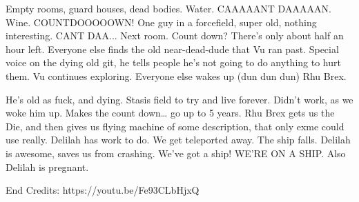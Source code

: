 Empty rooms, guard houses, dead bodies. Water. CAAAAANT DAAAAAN. Wine. COUNTDOOOOOWN! One guy in a forcefield, super old, nothing interesting. CANT DAA... Next room. Count down? There’s only about half an hour left. Everyone else finds the old near-dead-dude that Vu ran past. Special voice on the dying old git, he tells people he’s not going to do anything to hurt them. Vu continues exploring. Everyone else wakes up (dun dun dun) Rhu Brex.\medskip

He’s old as fuck, and dying. Stasis field to try and live forever. Didn’t work, as we woke him up. Makes the count down… go up to 5 years. Rhu Brex gets us the Die, and then gives us flying machine of some description, that only exme could use really. Delilah has work to do. We get teleported away. The ship falls. Delilah is awesome, saves us from crashing. We’ve got a ship! WE’RE ON A SHIP. Also Delilah is pregnant.\medskip

End Credits: https://youtu.be/Fe93CLbHjxQ




%

\clearpage